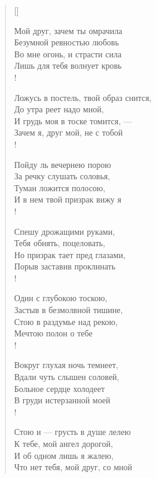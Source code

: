 \settowidth{\versewidth}{\vinБезумной ревностью любовь\ldotsq}
\begin{verse}[\versewidth]

\begin{altverse}
Мой друг, зачем ты омрачила\\
     Безумной ревностью любовь\ldotsq\\
Во мне огонь, и страсти сила\\
     Лишь для тебя волнует кровь\ldotst\\!

Ложусь в постель, твой образ снится,\\
     До утра реет надо мной,\\
И грудь моя в тоске томится, ---\\
     Зачем я, друг мой, не с тобой\ldotst\\!

Пойду ль вечернею порою\\
      За речку слушать соловья,\\
Туман ложится полосою,\\
      И в нем твой призрак вижу я\ldotst\\!

Спешу дрожащими руками,\\
    Тебя обнять, поцеловать,\\
Но призрак тает пред глазами,\\
      Порыв заставив проклинать\ldotst\\!

Один с глубокою  тоскою,\\
     Застыв в безмолвной тишине,\\
Стою в раздумье над рекою,\\
     Мечтою полон о тебе\ldotst\\!

Вокруг глухая ночь темнеет,\\
       Вдали чуть слышен соловей,\\
Больное сердце холодеет\\
        В груди истерзанной моей\ldotst\\!

Стою и --- грусть в душе лелею\\
     К тебе, мой ангел дорогой,\\
И об одном лишь я жалею,\\
  Что нет тебя, мой друг, со мной\ldotst
\end{altverse}
\end{verse}


